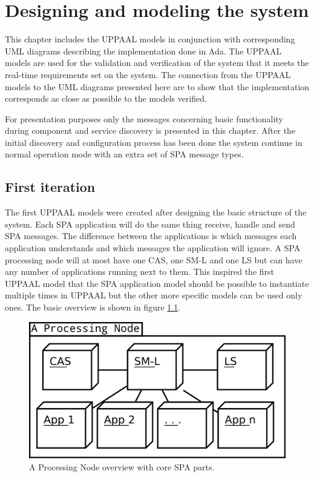 \chapter{Designing and modeling the system}\label{ch:uppaal_models}
This chapter includes the UPPAAL models in conjunction with corresponding UML
diagrams describing the implementation done in Ada. The UPPAAL models are used
for the validation and verification of the system that it meets the real-time
requirements set on the system. The connection from the UPPAAL models to the
UML diagrams presented here are to show that the implementation corresponds as
close as possible to the models verified.

For presentation purposes only the messages concerning basic functionality
during component and service discovery is presented in this chapter. After the
initial discovery and configuration process has been done the system continue
in normal operation mode with an extra set of SPA message types.

\section{First iteration}
The first UPPAAL models were created after designing the basic structure of the
system. Each SPA application will do the same thing receive, handle and send
SPA messages. The difference between the applications is which messages each
application understands and which messages the application will ignore. A SPA
processing node will at most have one CAS, one SM-L and one LS but can have any
number of applications running next to them. This inspired the first UPPAAL
model that the SPA application model should be possible to instantiate multiple
times in UPPAAL but the other more specific models can be used only ones. The
basic overview is shown in figure \ref{fig:processing_node_overview}.

\begin{figure}[h]
    \centering
    \includegraphics[width=\textwidth]{figures/processing_node_overview}
    \caption{A Processing Node overview with core SPA parts.}
    \label{fig:processing_node_overview}
\end{figure}


